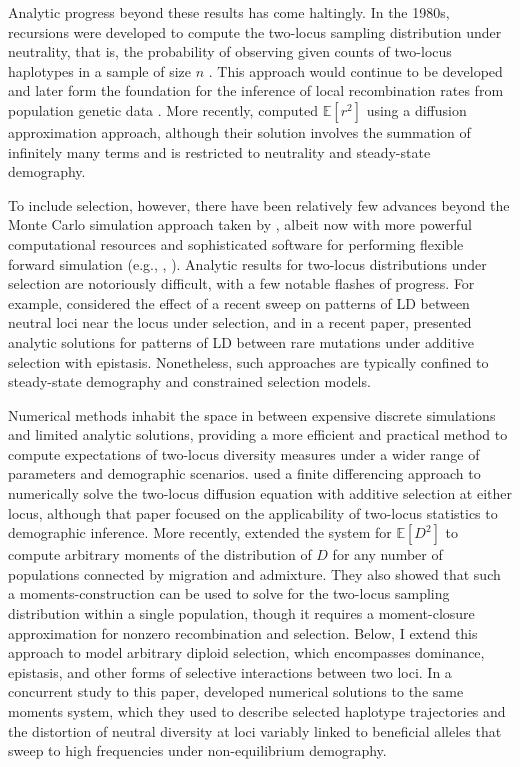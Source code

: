 \documentclass[]{article}
\newcommand{\E}{\mathbb{E}}
\begin{document}
Analytic progress beyond these results has come haltingly. In the 1980s,
recursions were developed to compute the two-locus sampling distribution under
neutrality, that is, the probability of observing given counts of two-locus
haplotypes in a sample of size \(n\) \citep{Golding1984-pu}. This approach would
continue to be developed and later form the foundation for the inference of
local recombination rates from population genetic data \citep{Hudson2001-sg, McVean2004-gj}. More recently, \citet{Song2007-qk} computed \(\E[r^2]\) using a
diffusion approximation approach, although their solution involves the
summation of infinitely many terms and is restricted to neutrality and
steady-state demography.

To include selection, however, there have been relatively few advances beyond
the Monte Carlo simulation approach taken by \citet{Hill1966-gv}, albeit now with more
powerful computational resources and sophisticated software for performing
flexible forward simulation (e.g., \citet{Thornton2014-pn}, \citet{Haller2019-vm}). Analytic
results for two-locus distributions under selection are notoriously difficult,
with a few notable flashes of progress. For example, \citet{McVean2007-xd} considered
the effect of a recent sweep on patterns of LD between neutral loci near the
locus under selection, and in a recent paper, \citet{Good2020-wj} presented analytic
solutions for patterns of LD between rare mutations under additive selection
with epistasis. Nonetheless, such approaches are typically confined to
steady-state demography and constrained selection models.

Numerical methods inhabit the space in between expensive discrete simulations
and limited analytic solutions, providing a more efficient and practical method
to compute expectations of two-locus diversity measures under a wider range of
parameters and demographic scenarios. \citet{Ragsdale2017-gg} used a finite
differencing approach to numerically solve the two-locus diffusion equation
with additive selection at either locus, although that paper focused on the
applicability of two-locus statistics to demographic inference. More recently,
\citet{Ragsdale2019-nt} extended the \citet{Hill1968-vu} system for \(\E[D^2]\) to compute
arbitrary moments of the distribution of \(D\) for any number of populations
connected by migration and admixture. They also showed that such a
moments-construction can be used to solve for the two-locus sampling
distribution within a single population, though it requires a moment-closure
approximation for nonzero recombination and selection. Below, I extend this
approach to model arbitrary diploid selection, which encompasses dominance,
epistasis, and other forms of selective interactions between two loci. In a
concurrent study to this paper, \citet{Friedlander2021-bs} developed numerical
solutions to the same moments system, which they used to describe selected
haplotype trajectories and the distortion of neutral diversity at loci variably
linked to beneficial alleles that sweep to high frequencies under
non-equilibrium demography.
\end{document}
